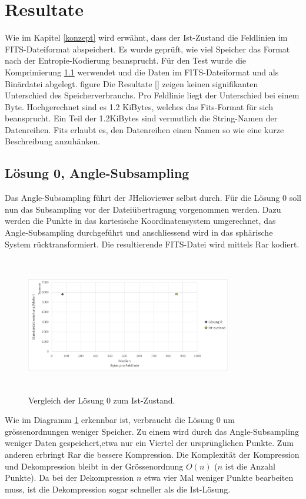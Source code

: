 \section{Resultate}\label{resultate}
Wie im Kapitel \ref{konzept} wird erwähnt, dass der Ist-Zustand die Feldlinien im FITS-Dateiformat abspeichert. Es wurde geprüft, wie viel Speicher das Format nach der Entropie-Kodierung beansprucht. Für den Test wurde die Komprimierung \ref{resultate:loesung0} werwendet und die Daten im FITS-Dateiformat und als Binärdatei abgelegt.
figure
Die Resultate \ref{} zeigen keinen signifikanten Unterschied des Speicherverbrauchs. Pro Feldlinie liegt der Unterschied bei einem Byte. Hochgerechnet sind es 1.2 KiBytes, welches das Fits-Format für sich beansprucht. Ein Teil der 1.2KiBytes sind vermutlich die String-Namen der Datenreihen. Fits erlaubt es, den Datenreihen einen Namen so wie eine kurze Beschreibung anzuhänken.

\subsection{Lösung 0, Angle-Subsampling} \label{resultate:loesung0}
Das Angle-Subsampling führt der JHelioviewer selbst durch. Für die Lösung 0 soll nun das Subsampling vor der Dateiübertragung vorgenommen werden. Dazu werden die Punkte in das kartesische Koordinatensystem umgerechnet, das Angle-Subsampling durchgeführt und anschliessend wird in das sphärische System rücktransformiert. Die resultierende FITS-Datei wird mittels Rar kodiert.
\begin{figure}[!htbp]
	\center
	\includegraphics[width=0.8\textwidth,height=6cm,keepaspectratio]{./pictures/resultate/loesung0/loesung0_0.png}
	\caption{Vergleich der Lösung 0 zum Ist-Zustand.}
	\label{resultate:loesung0:loesung0_0}
\end{figure}
Wie im Diagramm \ref{resultate:loesung0:loesung0_0} erkennbar ist, verbraucht die Lösung 0 um grössenordnungen weniger Speicher. Zu einem wird durch das Angle-Subsampling weniger Daten gespeichert,etwa nur ein Viertel der ursprünglichen Punkte. Zum anderen erbringt Rar die bessere Kompression. Die Komplexität der Kompression und Dekompression bleibt in der Grössenordnung $O(n)$ ($n$ ist die Anzahl Punkte). Da bei der Dekompression $n$ etwa vier Mal weniger Punkte bearbeiten muss, ist die Dekompression sogar schneller als die Ist-Lösung.

